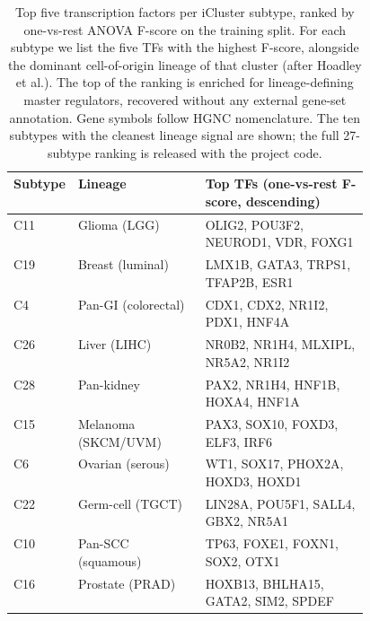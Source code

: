 \documentclass[11pt]{article}
\begin{document}
\begin{table}[t]
\centering
\caption{Top five transcription factors per iCluster subtype, ranked by
one-vs-rest ANOVA F-score on the training split. For each subtype we list
the five TFs with the highest F-score, alongside the dominant
cell-of-origin lineage of that cluster (after Hoadley et al.). The top of
the ranking is enriched for lineage-defining master regulators, recovered
without any external gene-set annotation. Gene symbols follow HGNC
nomenclature. The ten subtypes with the cleanest lineage signal are shown;
the full 27-subtype ranking is released with the project code.}
\label{tab:tf_bio}
\small
\setlength{\tabcolsep}{6pt}
\renewcommand{\arraystretch}{1.15}
\begin{tabular}{llp{0.46\linewidth}}
\toprule
\textbf{Subtype} & \textbf{Lineage} & \textbf{Top TFs (one-vs-rest F-score, descending)} \\
\midrule
C11 & Glioma (LGG)         & OLIG2, POU3F2, NEUROD1, VDR, FOXG1 \\
C19 & Breast (luminal)     & LMX1B, GATA3, TRPS1, TFAP2B, ESR1 \\
C4  & Pan-GI (colorectal)  & CDX1, CDX2, NR1I2, PDX1, HNF4A \\
C26 & Liver (LIHC)         & NR0B2, NR1H4, MLXIPL, NR5A2, NR1I2 \\
C28 & Pan-kidney           & PAX2, NR1H4, HNF1B, HOXA4, HNF1A \\
C15 & Melanoma (SKCM/UVM)  & PAX3, SOX10, FOXD3, ELF3, IRF6 \\
C6  & Ovarian (serous)     & WT1, SOX17, PHOX2A, HOXD3, HOXD1 \\
C22 & Germ-cell (TGCT)     & LIN28A, POU5F1, SALL4, GBX2, NR5A1 \\
C10 & Pan-SCC (squamous)   & TP63, FOXE1, FOXN1, SOX2, OTX1 \\
C16 & Prostate (PRAD)      & HOXB13, BHLHA15, GATA2, SIM2, SPDEF \\
\bottomrule
\end{tabular}
\end{table}


\clearpage
\end{document}
